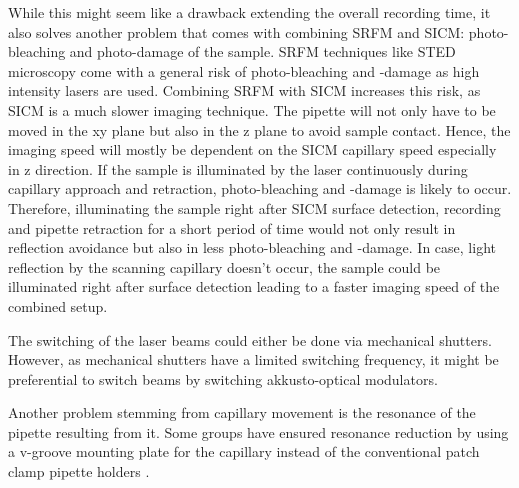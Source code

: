 While this might seem like a drawback extending the overall recording time, it
also solves another problem that comes with combining SRFM and SICM:
photo-bleaching and photo-damage of the sample. SRFM techniques like STED
microscopy come with a general risk of photo-bleaching and -damage as high
intensity lasers are used. Combining SRFM with SICM increases this risk,
as SICM is a much slower imaging technique. The pipette will not only have to
be moved in the xy plane but also in the z plane to avoid sample
contact. Hence, the imaging speed will mostly be dependent on the SICM
capillary speed especially in z direction. If the sample is illuminated by the
laser continuously during capillary approach and retraction, photo-bleaching
and -damage is likely to occur. Therefore, illuminating the sample right after
SICM surface detection, recording and pipette retraction for a short period of
time would not only result in reflection avoidance but also in less
photo-bleaching and -damage. In case, light reflection by the scanning
capillary doesn't occur, the sample could be illuminated right after surface
detection leading to a faster imaging speed of the combined setup.

The switching of the laser beams could either be done via mechanical
shutters. However, as mechanical shutters have a limited switching frequency,
it might be preferential to switch beams by switching akkusto-optical modulators.

Another problem stemming from capillary movement is the resonance of the
pipette resulting from it. Some groups have ensured resonance reduction by
using a v-groove mounting plate for the capillary instead of the conventional
patch clamp pipette holders \cite{Shevchuk.2013}.

 	


